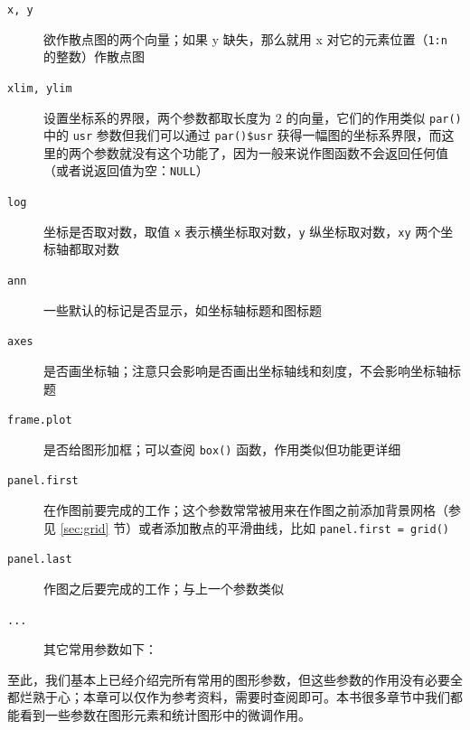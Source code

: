 \documentclass[
  b5paper,
  UTF8,twoside]{book}
\providecommand{\tightlist}{%
  \setlength{\itemsep}{0pt}\setlength{\parskip}{0pt}}
\begin{document}
\begin{description}
\item[\texttt{x,\ y}]
欲作散点图的两个向量；如果 y 缺失，那么就用 x 对它的元素位置（\texttt{1:n} 的整数）作散点图
\item[\texttt{xlim,\ ylim}]
设置坐标系的界限，两个参数都取长度为 2 的向量，它们的作用类似 \texttt{par()} 中的 \texttt{usr} 参数但我们可以通过 \texttt{par()\$usr} 获得一幅图的坐标系界限，而这里的两个参数就没有这个功能了，因为一般来说作图函数不会返回任何值（或者说返回值为空：\texttt{NULL}）
\item[\texttt{log}]
坐标是否取对数，取值 \texttt{\textquotesingle{}x\textquotesingle{}} 表示横坐标取对数，\texttt{\textquotesingle{}y\textquotesingle{}} 纵坐标取对数，\texttt{\textquotesingle{}xy\textquotesingle{}} 两个坐标轴都取对数
\item[\texttt{ann}]
一些默认的标记是否显示，如坐标轴标题和图标题
\item[\texttt{axes}]
是否画坐标轴；注意只会影响是否画出坐标轴线和刻度，不会影响坐标轴标题
\item[\texttt{frame.plot}]
是否给图形加框；可以查阅 \texttt{box()} 函数，作用类似但功能更详细
\item[\texttt{panel.first}]
在作图前要完成的工作；这个参数常常被用来在作图之前添加背景网格（参见 \ref{sec:grid} 节）或者添加散点的平滑曲线，比如 \texttt{panel.first\ =\ grid()}
\item[\texttt{panel.last}]
作图之后要完成的工作；与上一个参数类似
\item[\texttt{...}]
其它常用参数如下：

\end{description}

至此，我们基本上已经介绍完所有常用的图形参数，但这些参数的作用没有必要全都烂熟于心；本章可以仅作为参考资料，需要时查阅即可。本书很多章节中我们都能看到一些参数在图形元素和统计图形中的微调作用。
\end{document}
